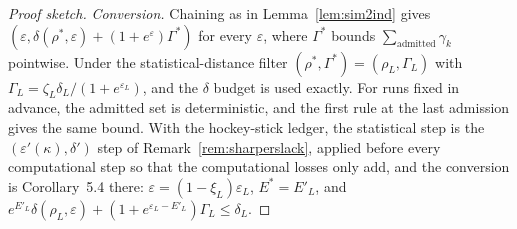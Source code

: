 \documentclass[11pt]{article}
\newif\ifshowchecks
\newcounter{checkitem}
\newcommand{\tocheck}[1]{%
  \ifshowchecks
    \refstepcounter{checkitem}%
    \addcontentsline{loc}{checkitem}{\protect\numberline{\thecheckitem}#1}%
    {\color{red!65!black}\sffamily\small[\textbf{Check~\thecheckitem:} #1]}%
  \fi}
\theoremstyle{definition}
\theoremstyle{plain}
\begin{document}
\begin{proof}[Proof sketch]
\emph{Conversion.} Chaining as in Lemma~\ref{lem:sim2ind} gives $(\varepsilon, \delta(\rho^*, \varepsilon) + (1 + e^{\varepsilon})\Gamma^*)$ for every $\varepsilon$, where $\Gamma^*$ bounds $\sum_{\mathrm{admitted}}\gamma_k$ pointwise. Under the statistical-distance filter $(\rho^*, \Gamma^*) = (\rho_L, \Gamma_L)$ with $\Gamma_L = \zeta_L\delta_L/(1 + e^{\varepsilon_L})$, and the $\delta$ budget is used exactly. For runs fixed in advance, the admitted set is deterministic, and the first rule at the last admission gives the same bound. With the hockey-stick ledger, the statistical step is the $(\varepsilon'(\kappa), \delta')$ step of Remark~\ref{rem:sharperslack}, applied before every computational step so that the computational losses only add, and the conversion is Corollary~5.4 there: $\varepsilon = (1 - \xi_L)\varepsilon_L$, $E^* = E'_L$, and $e^{E'_L}\delta(\rho_L, \varepsilon) + (1 + e^{\varepsilon_L - E'_L})\Gamma_L \le \delta_L$.
\end{proof}

\tocheck{Composition: the proof, including the adaptive hybrid and the hockey-stick ledger, is written out in the composition appendix of the proofs (Theorems~4.2 and~5.2, Corollary~5.4), with a self-contained R\'enyi filter, so the cited filter results are attributions only. Not proved there: that the first rule (runs fixed in advance) is valid when the requests are chosen adaptively, where the proof gives only $\delta(\sup\rho_\Sigma, \varepsilon_L) + (1 + e^{\varepsilon_L})\sup\Gamma_\Sigma$, which can approach $2\delta_L$; and the cut-off argument for the expected-polynomial-time exact sampler inside the reductions, which is stated but not written out. The per-run results it takes from Part~A of the proofs were not re-verified. The bibliographic details of the filter literature were checked only through search-engine extracts: Feldman and Zrnic's theorem number in the NeurIPS version, the pages of Rogers et al.\ (1921--1929), and the volume and pages of Whitehouse et al.\ (PMLR~202, 36990--37007).}
\end{document}
